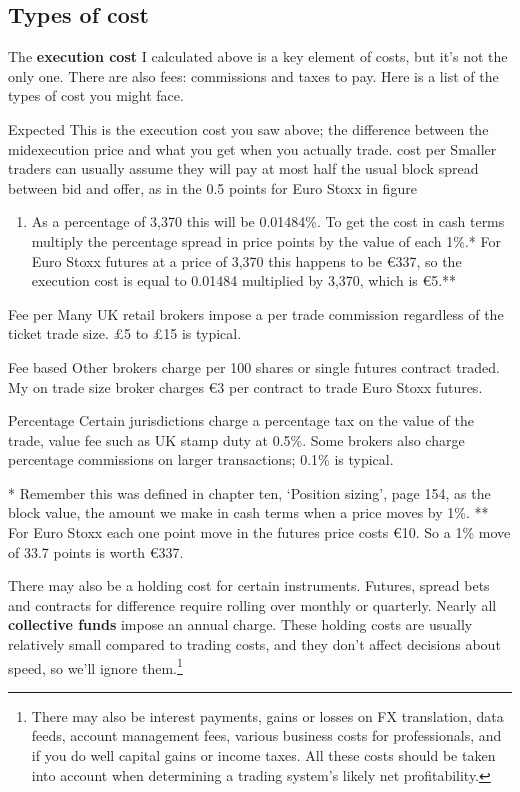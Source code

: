 \subsection*{Types of cost}

The \textbf{execution cost} I calculated above is a key element of costs, but it's not the only one. There are also fees: commissions and taxes to pay. Here is a list of the types of cost you might face.

Expected This is the execution cost you saw above; the difference between the midexecution price and what you get when you actually trade. cost per Smaller traders can usually assume they will pay at most half the usual block spread between bid and offer, as in the 0.5 points for Euro Stoxx in figure

\begin{enumerate}
\item As a percentage of 3,370 this will be 0.01484\%. To get the cost in cash terms multiply the percentage spread in price points by the value of each 1\%.* For Euro Stoxx futures at a price of 3,370 this happens to be €337, so the execution cost is equal to 0.01484 multiplied by 3,370, which is €5.**\end{enumerate}

Fee per Many UK retail brokers impose a per trade commission regardless of the ticket trade size. £5 to £15 is typical.

Fee based Other brokers charge per 100 shares or single futures contract traded. My on trade size broker charges €3 per contract to trade Euro Stoxx futures.

Percentage Certain jurisdictions charge a percentage tax on the value of the trade, value fee such as UK stamp duty at 0.5\%. Some brokers also charge percentage commissions on larger transactions; 0.1\% is typical.

* Remember this was defined in chapter ten, ‘Position sizing', page 154, as the block value, the amount we make in cash terms when a price moves by 1\%. ** For Euro Stoxx each one point move in the futures price costs €10. So a 1\% move of 33.7 points is worth €337.

There may also be a holding cost for certain instruments. Futures, spread bets and contracts for difference require rolling over monthly or quarterly. Nearly all \textbf{collective funds} impose an annual charge. These holding costs are usually relatively small compared to trading costs, and they don't affect decisions about speed, so we'll ignore them.\footnote{There may also be interest payments, gains or losses on FX translation, data feeds, account management fees, various business costs for professionals, and if you do well capital gains or income taxes. All these costs should be taken into account when determining a trading system’s likely net profitability.}

